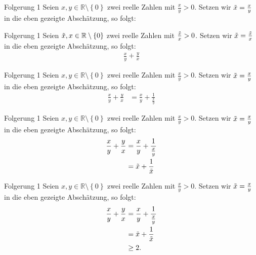\documentclass[10pt]{beamer}
\def\bR{\mathbb{R}}
\begin{document}
\begin{frame}{Folgerung 1}
    Seien \( x, y \in \bR \setminus \left\{ 0 \right\} \) zwei reelle Zahlen mit \( \frac{x}{y} > 0 \). Setzen wir \( \Tilde{x} = \frac{x}{y} \) in die eben gezeigte Abschätzung, so folgt:
\end{frame}



\begin{frame}{Folgerung 1}
    Seien \( \Tilde{x}, x \in \bR \setminus \left\{ 0 \right\} \) zwei reelle Zahlen mit \( \frac{\Tilde{x}}{x} > 0 \). Setzen wir \( \Tilde{x} = \frac{\Tilde{x}}{x} \) in die eben gezeigte Abschätzung, so folgt:
    \begin{align*}
        \frac{x}{y} + \frac{y}{x}
    \end{align*}
\end{frame}



\begin{frame}{Folgerung 1}
    Seien \( x, y \in \bR \setminus \left\{ 0 \right\} \) zwei reelle Zahlen mit \( \frac{x}{y} > 0 \). Setzen wir \( \Tilde{x} = \frac{x}{y} \) in die eben gezeigte Abschätzung, so folgt:
    \begin{align*}
        \frac{x}{y} + \frac{y}{x}
        & = \frac{x}{y} + \frac{1}{\frac{x}{y}}
    \end{align*}
\end{frame}



\begin{frame}{Folgerung 1}
    Seien \( x, y \in \bR \setminus \left\{ 0 \right\} \) zwei reelle Zahlen mit \( \frac{x}{y} > 0 \). Setzen wir \( \Tilde{x} = \frac{x}{y} \) in die eben gezeigte Abschätzung, so folgt:
    \begin{align*}
        \frac{x}{y} + \frac{y}{x}
        & = \frac{x}{y} + \frac{1}{\frac{x}{y}} \\
        & = \Tilde{x} + \frac{1}{\Tilde{x}}
    \end{align*}
\end{frame}



\begin{frame}{Folgerung 1}
    Seien \( x, y \in \bR \setminus \left\{ 0 \right\} \) zwei reelle Zahlen mit \( \frac{x}{y} > 0 \). Setzen wir \( \Tilde{x} = \frac{x}{y} \) in die eben gezeigte Abschätzung, so folgt:
    \begin{align*}
        \frac{x}{y} + \frac{y}{x}
        & = \frac{x}{y} + \frac{1}{\frac{x}{y}} \\
        & = \Tilde{x} + \frac{1}{\Tilde{x}} \\
        & \geq 2.
    \end{align*}
\end{frame}
\end{document}
